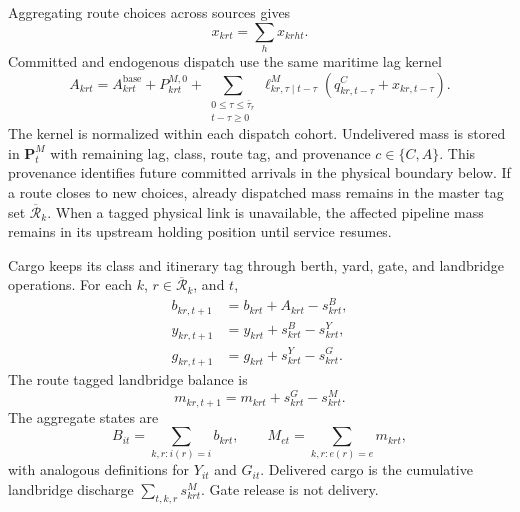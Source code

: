\documentclass[a4paper,fleqn]{cas-sc}
\begin{document}
Aggregating route choices across sources gives
\begin{equation}
 x_{krt}=\sum_hx_{krht}.
 \label{eq:route-dispatch}
\end{equation}
Committed and endogenous dispatch use the same maritime lag kernel
\begin{equation}
 A_{krt}=A^{\mathrm{base}}_{krt}+P^{M,0}_{krt}
 +\sum_{\substack{0\le\tau\le\bar\tau_r\\t-\tau\ge0}}
 \ell^M_{kr,\tau\mid t-\tau}
 \left(q^C_{kr,t-\tau}+x_{kr,t-\tau}\right).
 \label{eq:route-arrival}
\end{equation}
The kernel is normalized within each dispatch cohort. Undelivered mass is
stored in $\mathbf P^M_t$ with remaining lag, class, route tag, and provenance
$c\in\{C,A\}$. This provenance identifies future committed arrivals in the
physical boundary below. If a route closes to new choices, already dispatched
mass remains in the master tag set $\overline{\mathcal R}_k$. When a tagged
physical link is unavailable, the affected pipeline mass remains in its
upstream holding position until service resumes.

Cargo keeps its class and itinerary tag through berth, yard, gate, and
landbridge operations. For each $k$, $r\in\overline{\mathcal R}_k$, and $t$,
\begin{subequations}\label{eq:tagged-conservation}
\begin{align}
 b_{kr,t+1}&=b_{krt}+A_{krt}-s^B_{krt},
 \label{eq:berth-balance}\\
 y_{kr,t+1}&=y_{krt}+s^B_{krt}-s^Y_{krt},
 \label{eq:yard-balance}\\
 g_{kr,t+1}&=g_{krt}+s^Y_{krt}-s^G_{krt}.
 \label{eq:gate-balance}
\end{align}
\end{subequations}
The route tagged landbridge balance is
\begin{equation}
 m_{kr,t+1}=m_{krt}+s^G_{krt}-s^M_{krt}.
 \label{eq:landbridge-balance}
\end{equation}
The aggregate states are
\begin{equation}
 B_{it}=\sum_{k,r:i(r)=i}b_{krt},\qquad
 M_{et}=\sum_{k,r:e(r)=e}m_{krt},
 \label{eq:aggregate-tagged-states}
\end{equation}
with analogous definitions for $Y_{it}$ and $G_{it}$. Delivered cargo is the
cumulative landbridge discharge $\sum_{t,k,r}s^M_{krt}$. Gate release is not
delivery.
\end{document}
